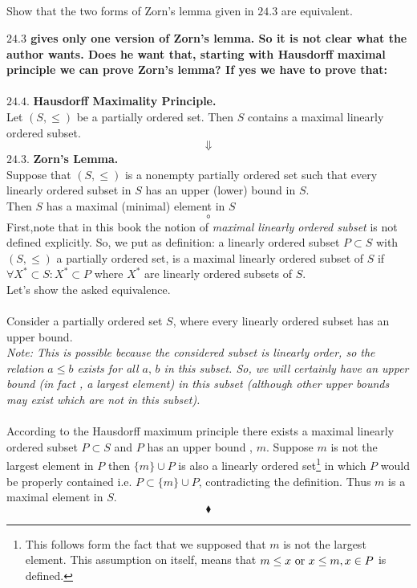 \subsection{}
\begin{tcolorbox}
Show that the two forms of Zorn's lemma given in $\mathbf{24.3}$ are equivalent. 
\end{tcolorbox}
$$ $$
\textbf{$\mathbf{24.3}$ gives only one version of Zorn's lemma. So it is not clear what the author wants. Does he want that, starting with Hausdorff maximal principle we can prove Zorn's lemma? If yes we have to prove that:}
\\\\
$\mathbf{24.4.}$\textbf{ Hausdorff Maximality Principle.} \\
Let $(S,\leq)$ be a partially ordered set. Then $S$ contains a maximal linearly ordered subset. 
$$\mathbf{\Downarrow} $$
$\mathbf{24.3.}$\textbf{ Zorn's Lemma.} \\
Suppose that $(S, \leq)$ is a nonempty partially ordered set such that every linearly ordered subset in $S$ has an upper (lower) bound in $S$.\\
 Then $S$ has a maximal (minimal) element in $S$ 
 $$\circ$$
 First,note that in this book the notion of \textit{maximal linearly ordered subset} is not defined explicitly. So, we put as definition: a linearly ordered subset $P\subset S$ with $(S,\leq)$ a partially ordered set, is a maximal linearly ordered subset of $S$ if  $\forall X^{*}\subset S:X^{*}\subset P$ where $X^{*}$ are linearly ordered subsets of $S$.\\
 Let's show the asked equivalence. \\\\
 Consider a partially ordered set $S$, where every linearly ordered subset has an upper bound.\\ \textit{Note: This is possible because the considered subset is linearly order, so the relation $a\leq b$ exists for all $a,\, b$ in this subset. So, we will certainly have an upper bound (in fact , a largest element) in this subset (although other upper bounds may exist which are not in this subset).} \\\\
 According to the Hausdorff maximum principle there exists a maximal linearly ordered subset $P\subset S$ and $P$ has an upper bound , $m$. Suppose $m$ is not the largest element in $P$ then $\{m\}\cup P$ is also a linearly ordered set\footnote{This follows form the fact that we supposed that $m$ is not the largest element. This assumption on itself,  means that $m\leq x\text{ or } x\leq m, x\in P$ is defined.} in which $P$ would be properly contained i.e. $P\subset \{m\}\cup P$, contradicting the definition. Thus $m$ is a maximal element in $S$.
$$\blacklozenge$$

